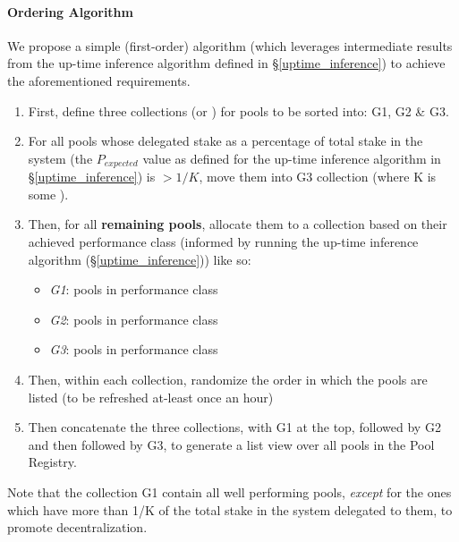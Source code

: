 \paragraph*{Ordering Algorithm} We propose a simple (first-order) algorithm (which leverages intermediate results from the up-time inference algorithm defined in \S\ref{uptime_inference}) to achieve the aforementioned requirements. 
\begin{enumerate}
    \item First, define three collections (or ) for pools to be sorted into: G1, G2 \& G3.
    \item For all pools whose delegated stake as a percentage of total stake in the system (the $P_{expected}$ value as defined for the up-time inference algorithm in \S\ref{uptime_inference}) is $ > 1/K$, move them into G3 collection (where K is some ). 
    \item Then, for all \textbf{remaining pools}, allocate them to a collection based on their achieved performance class (informed by running the up-time inference algorithm (\S\ref{uptime_inference})) like so: 
        \begin{itemize}[nosep, label=--]
            \item \textit{G1}: pools in performance class  
            \item \textit{G2}: pools in performance class 
            \item \textit{G3}: pools in performance class 
        \end{itemize}
    \item Then, within each collection, randomize the order in which the pools are listed (to be refreshed at-least once an hour)
    \item Then concatenate the three collections, with G1 at the top, followed by G2 and then followed by G3, to generate a list view over all pools in the Pool Registry. 
\end{enumerate}

Note that the collection G1 contain all well performing pools, \textit{except} for the ones which have more than 1/K of the total stake in the system delegated to them, to promote decentralization. 



